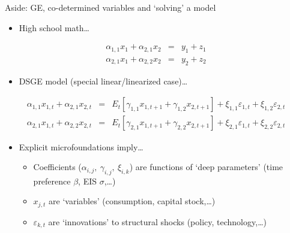 
\begin{frame}{Aside: GE, co-determined variables and `solving' a model}

\begin{itemize}
\item	High school math\ldots
\end{itemize}
\begin{eqnarray*}
\alpha_{1,1}x_{1} + \alpha_{2,1}x_{2}	&=& y_{1} + z_{1}	\\
\alpha_{2,1}x_{1} + \alpha_{2,2}x_{2}	&=& y_{2} + z_{2}
\end{eqnarray*}
\begin{itemize}
\item	DSGE model (special linear/linearized case)\ldots
\end{itemize}
\begin{small}
\begin{eqnarray*}
\alpha_{1,1}x_{1,t} + \alpha_{2,1}x_{2,t}	&=& E_{t}[ \gamma_{1,1} x_{1,t+1} + \gamma_{1,2} x_{2,t+1} ] + \xi_{1,1} \varepsilon_{1,t} + \xi_{1,2} \varepsilon_{2,t}	\\
\alpha_{2,1}x_{1,t} + \alpha_{2,2}x_{2,t}	&=& E_{t}[ \gamma_{2,1} x_{1,t+1} + \gamma_{2,2} x_{2,t+1} ] + \xi_{2,1} \varepsilon_{1,t} + \xi_{2,2} \varepsilon_{2,t}
\end{eqnarray*}
\end{small}
\begin{itemize}
\item	Explicit microfoundations imply\ldots
	\begin{itemize}
	\item	Coefficients ($\alpha_{i,j},\:\gamma_{i,j},\: \xi_{i,k}$) are functions of `deep parameters' (time preference $\beta$, EIS $\sigma$,\ldots)
	\item	$x_{j,t}$ are `variables' (consumption, capital stock,\ldots)
	\item	$\varepsilon_{k,t}$ are `innovations' to structural shocks (policy, technology,\ldots)
	\end{itemize}
\end{itemize}

\end{frame}


